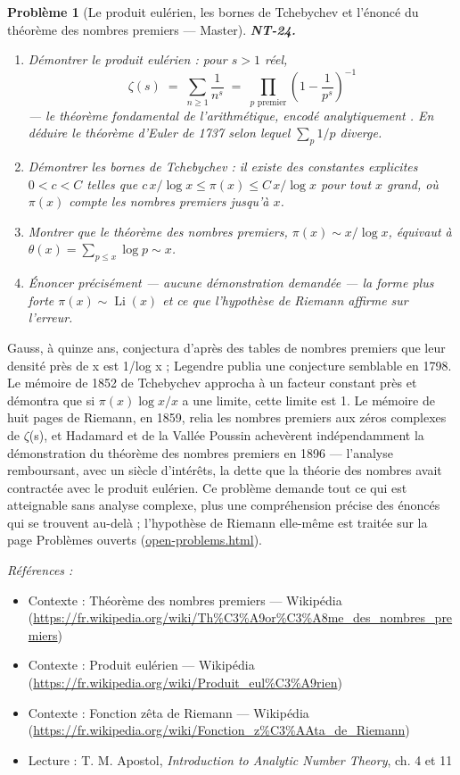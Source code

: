 \documentclass[11pt]{article}
\newtheorem{problem}{Problème}
\newenvironment{refs}{\par\small\noindent\emph{Références :}\begin{itemize}\setlength\itemsep{0pt}}{\end{itemize}\normalsize}
\begin{document}
\bigskip

\begin{problem}[{Le produit eulérien, les bornes de Tchebychev et l'énoncé du théorème des nombres premiers --- Master}]
\textbf{NT-24.} \begin{enumerate}
\item[(i)] Démontrer le produit eulérien : pour $s > 1$ réel,
\[ \zeta(s) \;=\; \sum_{n \ge 1} \frac{1}{n^s} \;=\; \prod_{p \text{ premier}} \left(1 - \frac{1}{p^s}\right)^{-1} \]
--- \og{} le théorème fondamental de l'arithmétique, encodé analytiquement \fg{}. En déduire le théorème
d'Euler de 1737 selon lequel $\sum_p 1/p$ diverge.
\item[(ii)] Démontrer les bornes de Tchebychev : il existe des constantes explicites
$0 < c < C$ telles que $c\,x/\log x \le \pi(x) \le C\,x/\log x$ pour tout
$x$ grand, où $\pi(x)$ compte les nombres premiers jusqu'à $x$.
\item[(iii)] Montrer que le théorème
des nombres premiers, $\pi(x) \sim x/\log x$, équivaut à
$\theta(x) = \sum_{p \le x} \log p \sim x$.
\item[(iv)] Énoncer précisément --- aucune démonstration demandée ---
la forme plus forte $\pi(x) \sim \operatorname{Li}(x)$ et ce que l'hypothèse de Riemann
affirme sur l'erreur.
\end{enumerate}

\end{problem}

\noindent Gauss, à quinze ans, conjectura d'après des tables de nombres premiers que leur
densité près de x est 1/log x ; Legendre publia une conjecture semblable en 1798. Le mémoire de 1852
de Tchebychev approcha à un facteur constant près et démontra que si $\pi(x)\log x / x$ a une
limite, cette limite est 1. Le mémoire de huit pages de Riemann, en 1859, relia les nombres premiers
aux zéros complexes de $\zeta$(s), et Hadamard et de la Vallée Poussin achevèrent indépendamment la
démonstration du théorème des nombres premiers en 1896 --- l'analyse remboursant, avec un siècle
d'intérêts, la dette que la théorie des nombres avait contractée avec le produit eulérien. Ce
problème demande tout ce qui est atteignable sans analyse complexe, plus une compréhension précise
des énoncés qui se trouvent au-delà ; l'hypothèse de Riemann elle-même est traitée sur la page
Problèmes ouverts (\url{open-problems.html}).

\begin{refs}
\item Contexte : Théorème des nombres premiers --- Wikipédia (\url{https://fr.wikipedia.org/wiki/Th%C3%A9or%C3%A8me_des_nombres_premiers})
\item Contexte : Produit eulérien --- Wikipédia (\url{https://fr.wikipedia.org/wiki/Produit_eul%C3%A9rien})
\item Contexte : Fonction zêta de Riemann --- Wikipédia (\url{https://fr.wikipedia.org/wiki/Fonction_z%C3%AAta_de_Riemann})
\item Lecture : T. M. Apostol, \textit{Introduction to Analytic Number Theory}, ch. 4 et 11
\end{refs}
\end{document}

